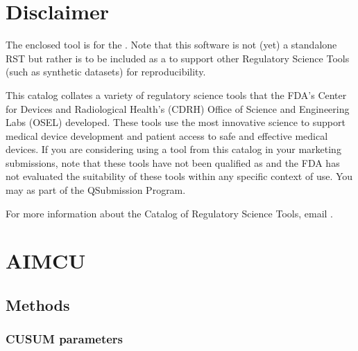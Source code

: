 \documentclass[letterpaper,10pt,oneside,english]{sphinxmanual}
\begin{document}
\chapter{Disclaimer}
\label{\detokenize{index:disclaimer}}
\sphinxAtStartPar
{}

\sphinxAtStartPar
The enclosed tool is  for the . Note that this software is not (yet) a standalone RST but rather is to be included as a  to support other Regulatory Science Tools (such as synthetic datasets) for reproducibility.

\sphinxAtStartPar
This catalog collates a variety of regulatory science tools that the FDA’s Center for Devices and Radiological Health’s (CDRH) Office of Science and Engineering Labs (OSEL) developed. These tools use the most innovative science to support medical device development and patient access to safe and effective medical devices. If you are considering using a tool from this catalog in your marketing submissions, note that these tools have not been qualified as  and the FDA has not evaluated the suitability of these tools within any specific context of use. You may  as part of the Q\sphinxhyphen{}Submission Program.

\sphinxAtStartPar
For more information about the Catalog of Regulatory Science Tools, email .


\chapter{AIM\sphinxhyphen{}CU}
\label{\detokenize{index:aim-cu}}
\sphinxstepscope


\section{Methods}
\label{\detokenize{ref_method:methods}}\label{\detokenize{ref_method::doc}}

\subsection{CUSUM parameters}
\label{\detokenize{ref_method:cusum-parameters}}
\end{document}

